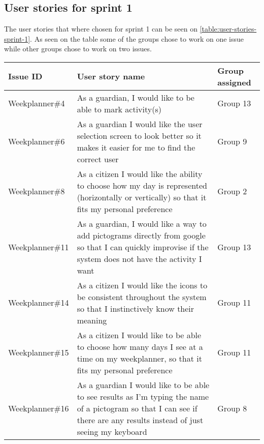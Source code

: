 \subsection{User stories for sprint 1}
The user stories that where chosen for sprint 1 can be seen on \autoref{table:user-stories-sprint-1}. As seen on the table some of the groups chose to work on one issue while other groups chose to work on two issues.

\begin{table}[H]
    \begin{tabular}{|p{2.8cm}|p{8cm}|p{2cm}|}
    \hline
    Issue ID        & User story name                                                                                                                                                          & Group assigned       \\ \hline
    Weekplanner\#4  & As a guardian, I would like to be able to mark activity(s)                                                                                                               & Group 13             \\ \hline
    Weekplanner\#6  & As a guardian I would like the user selection screen to look better so it makes it easier for me to find the correct user                                                & Group 9              \\ \hline
    Weekplanner\#8  & As a citizen I would like the ability to choose how my day is represented (horizontally or vertically) so that it fits my personal preference                            & Group 2              \\ \hline
    Weekplanner\#11 & As a guardian, I would like a way to add pictograms directly from google so that I can quickly improvise if the system does not have the activity I want                 & Group 13             \\ \hline
    Weekplanner\#14 & As a citizen I would like the icons to be consistent throughout the system so that I instinctively know their meaning                                                    & Group 11             \\ \hline
    Weekplanner\#15 & As a citizen I would like to be able to choose how many days I see at a time on my weekplanner, so that it fits my personal preference                                   & Group 11             \\ \hline
    Weekplanner\#16 & As a guardian I would like to be able to see results as I'm typing the name of a pictogram so that I can see if there are any results instead of just seeing my keyboard & Group 8              \\ \hline

\end{tabular}
\end{table}
